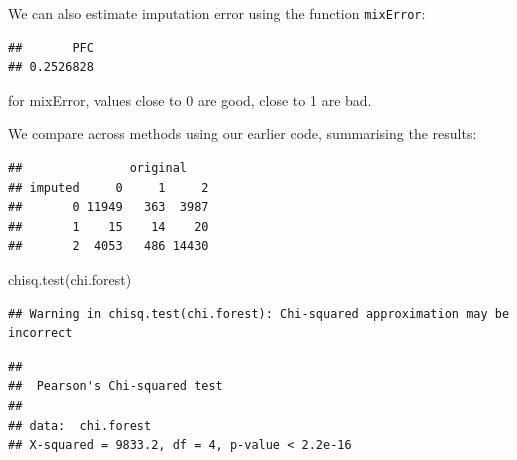 \documentclass[
]{book}
\newenvironment{Shaded}{\begin{snugshade}}{\end{snugshade}}
\newcommand{\AttributeTok}[1]{\textcolor[rgb]{0.77,0.63,0.00}{#1}}
\newcommand{\FloatTok}[1]{\textcolor[rgb]{0.00,0.00,0.81}{#1}}
\newcommand{\FunctionTok}[1]{\textcolor[rgb]{0.00,0.00,0.00}{#1}}
\newcommand{\NormalTok}[1]{#1}
\newcommand{\OtherTok}[1]{\textcolor[rgb]{0.56,0.35,0.01}{#1}}
\newcommand{\SpecialCharTok}[1]{\textcolor[rgb]{0.00,0.00,0.00}{#1}}
\newcommand{\StringTok}[1]{\textcolor[rgb]{0.31,0.60,0.02}{#1}}
\begin{document}
We can also estimate imputation error using the function \texttt{mixError}:

\begin{Shaded}
\end{Shaded}

\begin{verbatim}
##       PFC 
## 0.2526828
\end{verbatim}

for mixError, values close to 0 are good, close to 1 are bad.

We compare across methods using our earlier code, summarising the results:

\begin{Shaded}
\end{Shaded}

\begin{verbatim}
##               original
## imputed     0     1     2
##       0 11949   363  3987
##       1    15    14    20
##       2  4053   486 14430
\end{verbatim}

\begin{Shaded}
\begin{Highlighting}[]
\FunctionTok{chisq.test}\NormalTok{(chi.forest) }
\end{Highlighting}
\end{Shaded}

\begin{verbatim}
## Warning in chisq.test(chi.forest): Chi-squared approximation may be incorrect
\end{verbatim}

\begin{verbatim}
## 
##  Pearson's Chi-squared test
## 
## data:  chi.forest
## X-squared = 9833.2, df = 4, p-value < 2.2e-16
\end{verbatim}
\end{document}
